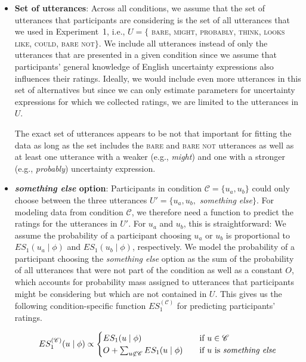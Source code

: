 \documentclass[man, floatsintext]{apa6}
\begin{document}
\begin{itemize}
\item \textbf{Set of utterances}: Across all conditions, we assume that the set of utterances that participants are 
considering is the set of all utterances that we used in Experiment~1, i.e., $U= \{$ \textsc{bare}, \textsc{might}, 
\textsc{probably}, \textsc{think}, \textsc{looks like}, \textsc{could}, \textsc{bare not}$\}$. We include all utterances 
instead of only the utterances that are presented in a given condition since we assume that participants' general 
knowledge of English uncertainty expressions also influences their ratings. Ideally, we would include even more 
utterances in this set of alternatives but since we can only estimate parameters for uncertainty expressions for 
which we collected ratings, we are limited to the utterances in $U$. 

The exact set of utterances appears to be not that important for fitting the data as long as the set includes the \textsc{bare}
and \textsc{bare not} utterances as well as at least one utterance with a weaker 
(e.g., \textit{might}) and one with a stronger (e.g., \textit{probably})
uncertainty expression.

\item \textbf{\textit{something else} option}: Participants in condition $\mathscr{C} = \{u_a, u_b\}$ 
could only choose between the three utterances $U' = \{u_a, u_b,$ \textit{something else}$\}$.
For modeling data from condition $\mathscr{C}$, we therefore need a function to predict the ratings 
for the utterances in $U'$. For $u_a$ and $u_b$, this is straightforward: We assume the probability 
of a participant choosing $u_a$ or $u_b$
is proportional to $ES_1(u_a \mid \phi)$ and $ES_1(u_b \mid \phi)$, respectively. 
We model the probability of a participant choosing the \textit{something else} option as the sum 
of the probability of all utterances that were not part of the condition as well as a constant $O$, 
which accounts for probability mass assigned to utterances that participants might be 
considering but which are not contained in $U$. This gives us the following condition-specific 
function $ES_1^{(\mathscr{C})}$ for predicting participants' ratings.

$$
ES_1^{(\mathscr{C})}(u \mid \phi) \propto 
    \begin{cases}
      ES_1(u \mid \phi) & \quad\mbox{if } u  \in \mathscr{C}\\
       O + \sum_{u \not \in \mathscr{C}} ES_1(u \mid \phi) & \quad \mbox{if $u$ is \textit{something else}} \\
   \end{cases}
$$


\end{itemize}
\end{document}
